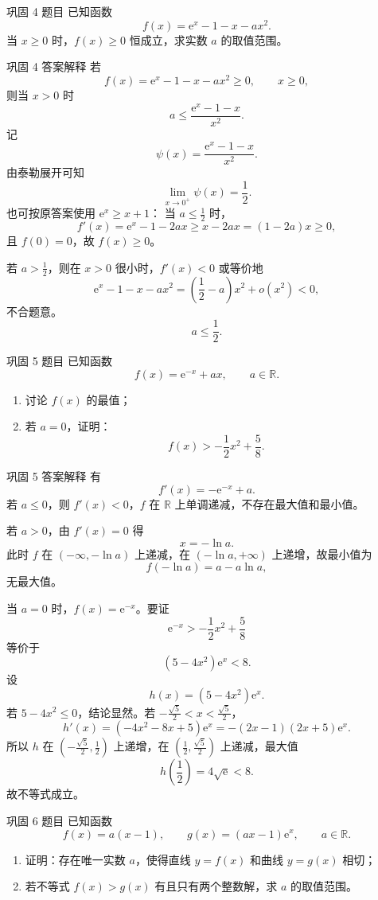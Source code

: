 ﻿\documentclass[aspectratio=169,10pt]{ctexbeamer}
\newcommand{\e}{\mathrm e}
\newcommand{\R}{\mathbb R}
\begin{document}
\begin{frame}{巩固 4 题目}
\small
已知函数
\[
f(x)=\e^x-1-x-ax^2.
\]
当 $x\ge0$ 时，$f(x)\ge0$ 恒成立，求实数 $a$ 的取值范围。
\end{frame}

\begin{frame}[allowframebreaks]{巩固 4 答案解释}
\small
若
\[
f(x)=\e^x-1-x-ax^2\ge0,\qquad x\ge0,
\]
则当 $x>0$ 时
\[
a\le\frac{\e^x-1-x}{x^2}.
\]
记
\[
\psi(x)=\frac{\e^x-1-x}{x^2}.
\]
由泰勒展开可知
\[
\lim_{x\to0^+}\psi(x)=\frac12.
\]
也可按原答案使用 $\e^x\ge x+1$：
当 $a\le\frac12$ 时，
\[
f'(x)=\e^x-1-2ax\ge x-2ax=(1-2a)x\ge0,
\]
且 $f(0)=0$，故 $f(x)\ge0$。

若 $a>\frac12$，则在 $x>0$ 很小时，$f'(x)<0$ 或等价地
\[
\e^x-1-x-ax^2=\left(\frac12-a\right)x^2+o(x^2)<0,
\]
不合题意。
\[
\boxed{a\le\frac12}.
\]
\end{frame}

\begin{frame}{巩固 5 题目}
\small
已知函数
\[
f(x)=\e^{-x}+ax,\qquad a\in\R.
\]
\begin{enumerate}
  \item 讨论 $f(x)$ 的最值；
  \item 若 $a=0$，证明：
  \[
  f(x)>-\frac12x^2+\frac58.
  \]
\end{enumerate}
\end{frame}

\begin{frame}[allowframebreaks]{巩固 5 答案解释}
\small
有
\[
f'(x)=-\e^{-x}+a.
\]
若 $a\le0$，则 $f'(x)<0$，$f$ 在 $\R$ 上单调递减，不存在最大值和最小值。

若 $a>0$，由 $f'(x)=0$ 得
\[
x=-\ln a.
\]
此时 $f$ 在 $(-\infty,-\ln a)$ 上递减，在 $(-\ln a,+\infty)$ 上递增，故最小值为
\[
f(-\ln a)=a-a\ln a,
\]
无最大值。

\framebreak

当 $a=0$ 时，$f(x)=\e^{-x}$。要证
\[
\e^{-x}>-\frac12x^2+\frac58
\]
等价于
\[
(5-4x^2)\e^x<8.
\]
设
\[
h(x)=(5-4x^2)\e^x.
\]
若 $5-4x^2\le0$，结论显然。若 $-\frac{\sqrt5}{2}<x<\frac{\sqrt5}{2}$，
\[
h'(x)=(-4x^2-8x+5)\e^x=-(2x-1)(2x+5)\e^x.
\]
所以 $h$ 在 $(-\frac{\sqrt5}{2},\frac12)$ 上递增，在 $(\frac12,\frac{\sqrt5}{2})$ 上递减，最大值
\[
h\left(\frac12\right)=4\sqrt{\e}<8.
\]
故不等式成立。
\end{frame}

\begin{frame}{巩固 6 题目}
\small
已知函数
\[
f(x)=a(x-1),\qquad g(x)=(ax-1)\e^x,\qquad a\in\R.
\]
\begin{enumerate}
  \item 证明：存在唯一实数 $a$，使得直线 $y=f(x)$ 和曲线 $y=g(x)$ 相切；
  \item 若不等式 $f(x)>g(x)$ 有且只有两个整数解，求 $a$ 的取值范围。
\end{enumerate}
\end{frame}
\end{document}

